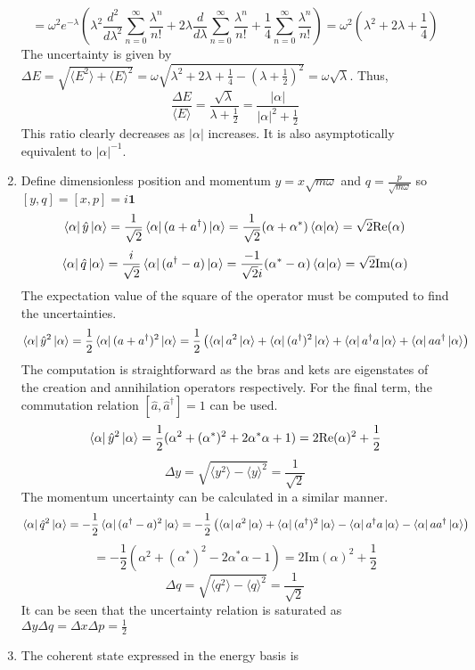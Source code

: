 \begin{sol}
\begin{enumerate}[label=\textbf{(\alph*)}]
$$=\omega^2e^{-\lambda}\left(\lambda^2\frac{d^2}{d\lambda^2}\sum_{n=0}^\infty\frac{\lambda^n}{n!}+2\lambda\frac{d}{d\lambda}\sum_{n=0}^\infty\frac{\lambda^n}{n!}+\frac{1}{4}\sum_{n=0}^\infty\frac{\lambda^n}{n!}\right)=\omega^2\left(\lambda^2+2\lambda+\frac{1}{4}\right)$$
The uncertainty is given by $\Delta E = \sqrt{\langle E^2\rangle+\langle E\rangle^2}=\omega\sqrt{\lambda^2+2\lambda+\frac{1}{4}-\left(\lambda+\frac{1}{2}\right)^2}=\omega\sqrt\lambda$. Thus,
$$\frac{\Delta E}{\langle E\rangle}=\frac{\sqrt{\lambda}}{\lambda+\frac{1}{2}}=\frac{|\alpha|}{|\alpha|^2+\frac{1}{2}}$$ 
This ratio clearly decreases as $|\alpha|$ increases. It is also asymptotically equivalent to $|\alpha|^{-1}$.
\item
Define dimensionless position and momentum $y=x\sqrt{m\omega}$ and $q=\frac{p}{\sqrt{m\omega}}$ so $[y,q]=[x,p]=i\mathbf{1}$ 
$$\bra\alpha\hat y\ket\alpha=\frac{1}{\sqrt{2}}\bra\alpha(a+a^\dagger)\ket\alpha=\frac{1}{\sqrt{2}}(\alpha+\alpha^*)\braket{\alpha}{\alpha}=\sqrt{2}\text{Re}(\alpha)$$ 
$$\bra \alpha\hat q\ket \alpha=\frac{i}{\sqrt{2}}\bra\alpha(a^\dagger-a)\ket\alpha=\frac{-1}{\sqrt{2}i}(\alpha^*-\alpha)\braket{\alpha}{\alpha}=\sqrt{2}\text{Im}(\alpha)$$
The expectation value of the square of the operator must be computed to find the uncertainties.
$$\bra\alpha\hat y^2\ket\alpha=\frac{1}{2}\bra\alpha(a+a^\dagger)^2\ket\alpha=\frac{1}{2}\left(\bra\alpha a^2\ket\alpha+\bra\alpha (a^\dagger)^2\ket\alpha+\bra\alpha a^\dagger a\ket\alpha+\bra\alpha aa^\dagger\ket\alpha\right)$$
The computation is straightforward as the bras and kets are eigenstates of the creation and annihilation operators respectively. For the final term, the commutation relation $[\hat a,\hat a^\dagger]=1$ can be used.
$$\bra\alpha\hat y^2\ket\alpha=\frac{1}{2}(\alpha^2+(\alpha^*)^2+2\alpha^*\alpha+1)=2\text{Re}(\alpha)^2+\frac{1}{2}$$ 
 $$\Delta y=\sqrt{\langle y^2\rangle-\langle y\rangle^2}=\frac{1}{\sqrt{2}}$$
 The momentum uncertainty can be calculated in a similar manner.
$$\bra\alpha\hat q^2\ket\alpha = -\frac{1}{2}\bra\alpha(a^\dagger-a)^2\ket\alpha=-\frac{1}{2}\left(\bra\alpha a^2\ket\alpha+\bra\alpha (a^\dagger)^2\ket\alpha-\bra\alpha a^\dagger a\ket\alpha-\bra\alpha aa^\dagger\ket\alpha\right)$$
$$=-\frac{1}{2}(\alpha^2+(\alpha^*)^2-2\alpha^*\alpha-1)=2\text{Im}(\alpha)^2+\frac{1}{2}$$
 $$\Delta q=\sqrt{\langle q^2\rangle-\langle q\rangle^2}=\frac{1}{\sqrt{2}}$$
It can be seen that the uncertainty relation is saturated as $\Delta y\Delta q=\Delta x\Delta p=\frac{1}{2}$
\item
The coherent state expressed in the energy basis is

\end{enumerate}
\end{sol}
